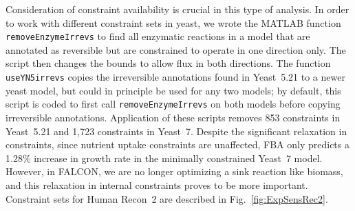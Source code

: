 Consideration of constraint availability is crucial in this type of
analysis. In order to work with different constraint sets in yeast, we
wrote the MATLAB function \texttt{removeEnzymeIrrevs} to find all
enzymatic reactions in a model that are annotated as reversible but
are constrained to operate in one direction only. The script then
changes the bounds to allow flux in both directions. The function
\texttt{useYN5irrevs} copies the irreversible annotations found in
Yeast~5.21 \citep{Lee2012} to a newer yeast model, but could in
principle be used for any two models; by default, this script is coded
to first call \texttt{removeEnzymeIrrevs} on both models before
copying irreversible annotations. Application of these scripts removes
853 constraints in Yeast~5.21 and 1,723 constraints in Yeast~7.
Despite the significant relaxation in constraints, since nutrient
uptake constraints are unaffected, FBA only predicts a 1.28\% increase
in growth rate in the minimally constrained Yeast~7 model. However, in
FALCON, we are no longer optimizing a sink reaction like biomass, and
this relaxation in internal constraints proves to be more important.
Constraint sets for Human Recon~2 are described in \suppOrApp 
Fig.~\ref{fig:ExpSensRec2}.

